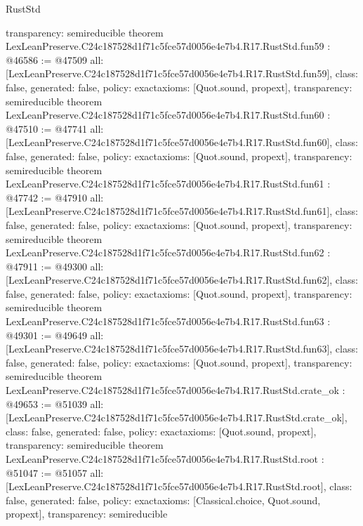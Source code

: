 \begin{lexlean}{RustStd}
\begin{coremodule}
{  transparency: semireducible
}
theorem LexLeanPreserve.C24c187528d1f71c5fce57d0056e4e7b4.R17.RustStd.fun59 : @46586 := @47509 {
  all: [LexLeanPreserve.C24c187528d1f71c5fce57d0056e4e7b4.R17.RustStd.fun59],
  class: false,
  generated: false,
  policy: exact{axioms: [Quot.sound, propext]},
  transparency: semireducible
}
theorem LexLeanPreserve.C24c187528d1f71c5fce57d0056e4e7b4.R17.RustStd.fun60 : @47510 := @47741 {
  all: [LexLeanPreserve.C24c187528d1f71c5fce57d0056e4e7b4.R17.RustStd.fun60],
  class: false,
  generated: false,
  policy: exact{axioms: [Quot.sound, propext]},
  transparency: semireducible
}
theorem LexLeanPreserve.C24c187528d1f71c5fce57d0056e4e7b4.R17.RustStd.fun61 : @47742 := @47910 {
  all: [LexLeanPreserve.C24c187528d1f71c5fce57d0056e4e7b4.R17.RustStd.fun61],
  class: false,
  generated: false,
  policy: exact{axioms: [Quot.sound, propext]},
  transparency: semireducible
}
theorem LexLeanPreserve.C24c187528d1f71c5fce57d0056e4e7b4.R17.RustStd.fun62 : @47911 := @49300 {
  all: [LexLeanPreserve.C24c187528d1f71c5fce57d0056e4e7b4.R17.RustStd.fun62],
  class: false,
  generated: false,
  policy: exact{axioms: [Quot.sound, propext]},
  transparency: semireducible
}
theorem LexLeanPreserve.C24c187528d1f71c5fce57d0056e4e7b4.R17.RustStd.fun63 : @49301 := @49649 {
  all: [LexLeanPreserve.C24c187528d1f71c5fce57d0056e4e7b4.R17.RustStd.fun63],
  class: false,
  generated: false,
  policy: exact{axioms: [Quot.sound, propext]},
  transparency: semireducible
}
theorem LexLeanPreserve.C24c187528d1f71c5fce57d0056e4e7b4.R17.RustStd.crate_ok : @49653 := @51039 {
  all: [LexLeanPreserve.C24c187528d1f71c5fce57d0056e4e7b4.R17.RustStd.crate_ok],
  class: false,
  generated: false,
  policy: exact{axioms: [Quot.sound, propext]},
  transparency: semireducible
}
theorem LexLeanPreserve.C24c187528d1f71c5fce57d0056e4e7b4.R17.RustStd.root : @51047 := @51057 {
  all: [LexLeanPreserve.C24c187528d1f71c5fce57d0056e4e7b4.R17.RustStd.root],
  class: false,
  generated: false,
  policy: exact{axioms: [Classical.choice, Quot.sound, propext]},
  transparency: semireducible
}


\end{coremodule}
\end{lexlean}
